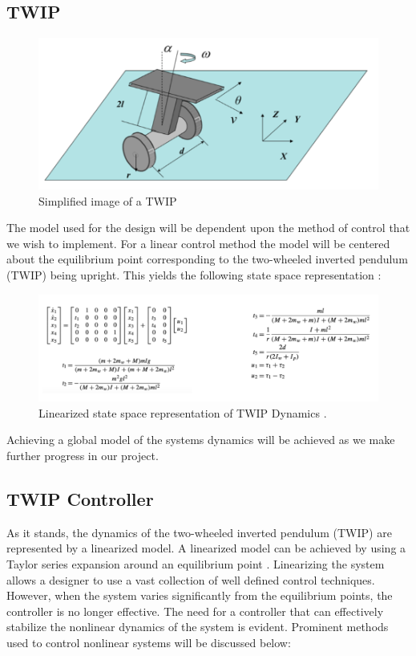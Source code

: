 \documentclass[a4paper,12pt]{article}
\begin{document}
\subsection{TWIP}
	\begin{figure}[H]
\includegraphics[width = \textwidth]{images/PDS_TWIP.png}
\caption{Simplified image of a TWIP\cite{yang}}
	\end{figure}
The model used for the design will be dependent upon the method of control that we wish to implement. For a linear control method the model will be centered about the equilibrium point corresponding to the two-wheeled inverted pendulum (TWIP) being upright. This yields the following state space representation \cite{yang} :
	\begin{figure}[H]
\includegraphics[width = \textwidth]{images/PDS_StateSpace.png}
\caption{Linearized state space representation of TWIP Dynamics \cite{yang}.}
	\end{figure}
Achieving a global model of the systems dynamics will be achieved as we make further progress in our project. 
\subsection{TWIP Controller}
As it stands, the dynamics of the two-wheeled inverted pendulum (TWIP) are represented by a linearized model. A linearized model can be achieved by using a Taylor series expansion around an equilibrium point \cite{yang}. Linearizing the system allows a designer to use a vast collection of well defined control techniques. However, when the system varies significantly from the equilibrium points, the controller is no longer effective. The need for a controller that can effectively stabilize the nonlinear dynamics of the system is evident. Prominent methods used to control nonlinear systems will be discussed below:
\end{document}

